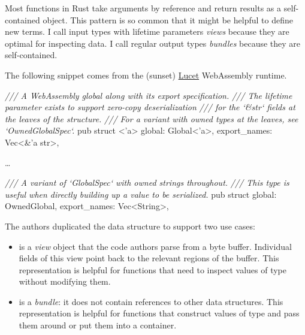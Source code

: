 \documentclass{article}
\begin{document}
Most functions in Rust take arguments by reference and return results as a self-contained object.
This pattern is so common that it might be helpful to define new terms.
I call input types with lifetime parameters \emph{views} because they are optimal for inspecting data.
I call regular output types \emph{bundles} because they are self-contained.

The following snippet comes from the (sunset) \href{https://github.com/bytecodealliance/lucet}{Lucet} WebAssembly runtime.
\begin{code}[rust]
\emph{/// A WebAssembly global along with its export specification.}
\emph{/// The lifetime parameter exists to support zero-copy deserialization}
\emph{/// for the `\&str` fields at the leaves of the structure.}
\emph{/// For a variant with owned types at the leaves, see `OwnedGlobalSpec`.}
pub struct \href{https://github.com/bytecodealliance/lucet/blob/51fb1ed414fe44f842db437d94abb6eb439d7c92/lucet-module/src/globals.rs#L8}{}<'a> {
    global: Global<'a>,
    export_names: Vec<&'a str>,
}

\ldots

\emph{/// A variant of `GlobalSpec` with owned strings throughout.}
\emph{/// This type is useful when directly building up a value to be serialized.}
pub struct \href{https://github.com/bytecodealliance/lucet/blob/51fb1ed414fe44f842db437d94abb6eb439d7c92/lucet-module/src/globals.rs#L112}{} {
    global: OwnedGlobal,
    export_names: Vec<String>,
}
\end{code}

The authors duplicated the  data structure to support two use cases:
\begin{itemize}
  \item
     is a \emph{view} object that the code authors parse from a byte buffer.
    Individual fields of this view point back to the relevant regions of the buffer.
    This representation is helpful for functions that need to inspect values of type  without modifying them.
  \item
     is a \emph{bundle}: it does not contain references to other data structures.
    This representation is helpful for functions that construct values of type  and pass them around or put them into a container.
\end{itemize}
\end{document}
